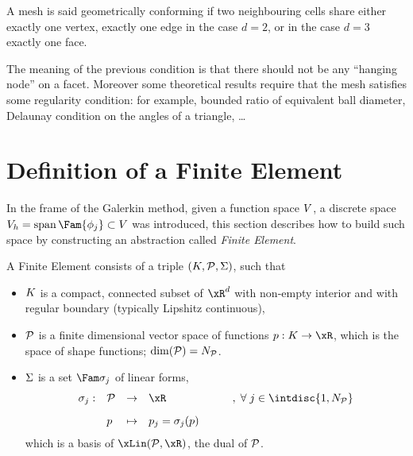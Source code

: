 \begin{dfntn}
A mesh is said geometrically conforming if two neighbouring cells share either exactly one vertex, exactly one edge in the case $d = 2$, or in the case $d = 3$ exactly one face.
\end{dfntn}

\medskip
The meaning of the previous condition is that there should not be any ``hanging node'' on a facet.
Moreover some theoretical results require that the mesh satisfies some regularity condition: for example, bounded ratio of equivalent ball diameter, Delaunay condition on the angles of a triangle, \dots

\section{Definition of a Finite Element}

In the frame of the Galerkin method, given a function space ${V}$, a discrete space $\xVh = \Span\Fam{\phi_j} \subset\xV$ was introduced, this section describes how to build such space by constructing an abstraction called \textit{Finite Element}.

\begin{dfntn}\label{def:finite_element}
A Finite Element consists of a triple ${({K},{\mathcal P}, {\Sigma})}$, such that
\begin{itemize}
\item ${K}$ is a compact, connected subset of $\xR^d$ with non-empty interior and with regular boundary (typically Lipshitz continuous),
\item ${\mathcal P}$ is a finite dimensional vector space of functions $p : K \rightarrow \xR$, which is the space of shape functions; $\dim({\mathcal P}) = N_{\mathcal P}$.
\item ${\Sigma}$ is a set $\Fam \sigma_j$ of linear forms,
\begin{equation*}
\begin{array}{lllll}
\sigma_j:& \SpaceP & \rightarrow & \xR &\qquad  ,\; \forany j \in \intdisc{1,N_\SpaceP}\\[2ex]
\hfill   & p       & \mapsto     & p_j = \sigma_j(p) &
\end{array}
\end{equation*}
which is a basis of $\xLin(\SpaceP,\xR)$, the dual of ${\mathcal P}$.
\end{itemize}
\end{dfntn}

